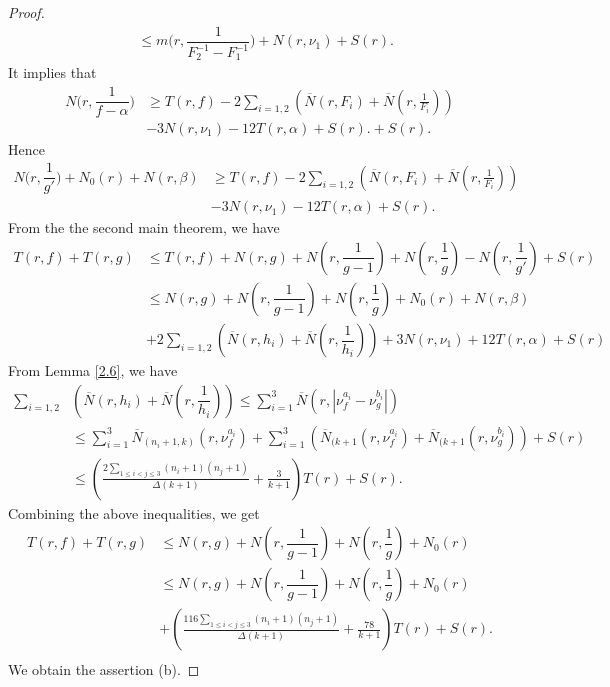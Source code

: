 \documentclass[12pt,leqno]{amsart}
\numberwithin{equation}{section}
\begin{document}
\begin{proof}
\begin{align*}
&\le m\Big(r,\dfrac{1}{F_2^{-1}-F_1^{-1}}\Big)+N(r,\nu_1)+S(r).
\end{align*}
It implies that
\begin{align*}
N\Big(r,\dfrac{1}{f-\alpha}\Big)&\ge T(r,f)-2\sum_{i=1,2}\left (\overline{N}(r,F_i)+\overline N(r,\frac{1}{F_i})\right)\\
&-3N(r,\nu_1)-12T(r,\alpha)+S(r).+S(r).
\end{align*}
Hence 
\begin{align*}
N\Big(r,\dfrac{1}{g'}\Big)+N_0(r)+N(r,\beta)&\ge T(r,f)-2\sum_{i=1,2}\left (\overline{N}(r,F_i)+\overline N(r,\frac{1}{F_i})\right)\\
&-3N(r,\nu_1)-12T(r,\alpha)+S(r).
\end{align*}
From the the second main theorem, we have
\begin{align*}
    T(r,f)+T(r,g)&\le T(r,f)+N(r,g)+N\left(r, \dfrac{1}{g-1}\right) +N\left(r, \dfrac{1}{g}\right)-N\left(r, \dfrac{1}{g'}\right)+S(r)\\
    &\le N(r,g)+N\left(r, \dfrac{1}{g-1}\right) +N\left(r, \dfrac{1}{g}\right)+N_0(r)+N(r, \beta)\\
    &+2\sum_{i=1,2}\left(\overline{N}(r, h_i)+\overline{N}\left(r, \dfrac{1}{h_i}\right)\right)+3N(r, \nu_1)+12T(r, \alpha)+S(r)
\end{align*}
From Lemma \ref{2.6}, we have
\begin{align*}
    \sum_{i=1,2}&\left(\overline{N}(r, h_i)+\overline{N}\left(r, \dfrac{1}{h_i}\right)\right)\le \sum_{i=1}^3\overline N(r,|\nu^{a_i}_f-\nu^{b_i}_g|)\\
    &\le \sum_{i=1}^3\overline N_{(n_i+1,k)}(r,\nu^{a_i}_f)+\sum_{i=1}^3\left(\overline N_{(k+1}(r,\nu^{a_i}_f)+\overline N_{(k+1}(r,\nu^{b_i}_g) \right)+S(r)\\
    &\le \left(\frac{2\sum_{1\le i<j\le 3}(n_i+1)(n_j+1)}{\Delta(k+1)}+\frac{3}{k+1}\right)T(r)+S(r).
\end{align*} 
Combining the above inequalities, we get
\begin{align*}
    T(r, f)+T(r, g)&\le N(r,g)+N\left(r, \dfrac{1}{g-1}\right) +N\left(r, \dfrac{1}{g}\right)+N_0(r)\\
    &\le N(r,g)+N\left(r, \dfrac{1}{g-1}\right) +N\left(r, \dfrac{1}{g}\right)+N_0(r)\\
    &+\left(\frac{116\sum_{1\le i<j\le 3}(n_i+1)(n_j+1)}{\Delta(k+1)}+\frac{78}{k+1}\right)T(r)+ S(r). \\
\end{align*}
We obtain the assertion (b).
\end{proof}
\end{document}
